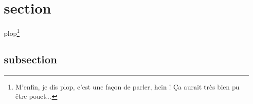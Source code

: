 \section{section}
	\lipsum
plop\footnote{M'enfin, je dis plop, c'est une façon de parler, hein ! Ça aurait très bien pu être pouet...}

\subsection{subsection}
	\lipsum[1]
